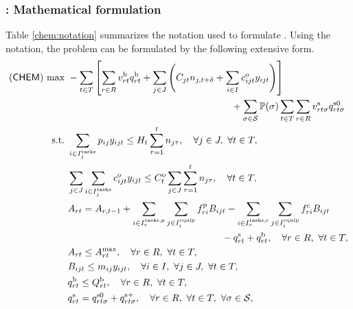 \subsubsection{\chem: Mathematical formulation}
Table \ref{chem:notation} summarizes the notation used to formulate \chem. Using the notation, the problem can be formulated by the following extensive form.
\begin{subequations} \label{chem:formulation}
	\begin{align}
	(\chem)\ \textrm{max}\ & -\sum_{t\in T}\left[ \sum_{r\in R}v_{rt}^\textrm{b}q_{rt}^\textrm{b} + \sum_{j\in J}\left( C_{jt}n_{j,t+\delta}+\sum_{i\in I}c_{ijt}^\textrm{o}y_{ijt} \right) \right] \nonumber \\ 
	&\qquad\qquad\qquad\qquad\qquad\qquad\qquad\qquad\quad+ \sum_{\sigma\in\mathcal{S}}\PP(\sigma)\sum_{t\in T}\sum_{r\in R} v_{rt\sigma}^{\textrm{s}}q_{rt\sigma}^{\textrm{s0}} \label{chem:obj}\\
	\textrm{s.t.}\ & \sum_{i\in I_j^{\textrm{tasks}}}p_{ij}y_{ijt}\le H_t\sum_{\tau=1}^{t}n_{j\tau},\quad\forall j\in J,\ \forall t\in T,\label{chem:b}\\
	&\sum_{j\in J}\sum_{i\in I_j^{\textrm{tasks}}}c_{ijt}^\textrm{o} y_{ijt} \le C_t^\textrm{o}\sum_{j\in J}\sum_{\tau=1}^{t}n_{j\tau},\quad\forall t\in T, \label{chem:c} \\
	&A_{rt}=A_{r,t-1}+\sum_{i\in I_r^{\textrm{tasks,p}}}\sum_{j\in I_i^\textrm{equip}}f_{ri}^\textrm{p}B_{ijt}-\sum_{i\in I_r^{\textrm{tasks,c}}}\sum_{j\in I_i^\textrm{equip}}f_{ri}^\textrm{c}B_{ijt}\nonumber\\
	&\qquad\qquad\qquad\qquad\qquad\qquad\qquad\quad\quad  -q_{rt}^\textrm{s}+q_{rt}^\textrm{b},\quad\forall r\in R,\ \forall t\in T,\label{chem:d}\\
	&A_{rt}\le A_{rt}^\textrm{max},\quad\forall r\in R,\ \forall t\in T,\label{chem:e}\\
	&B_{ijt}\le m_{ij}y_{ijt},\quad\forall i\in I,\ \forall j\in J,\ \forall t\in T,\label{chem:f}\\
	&q_{rt}^\textrm{b}\le Q_{rt}^\textrm{b},\quad\forall r\in R,\ \forall t\in T,\label{chem:i}\\
	&q_{rt}^\textrm{s}=q_{rt\sigma}^{\textrm{s0}}+q_{rt\sigma}^{\textrm{s+}},\quad\forall r\in R,\ \forall t\in T,\ \forall \sigma\in\mathcal{S},\label{chem:g}\\

\end{align}
\end{subequations}
